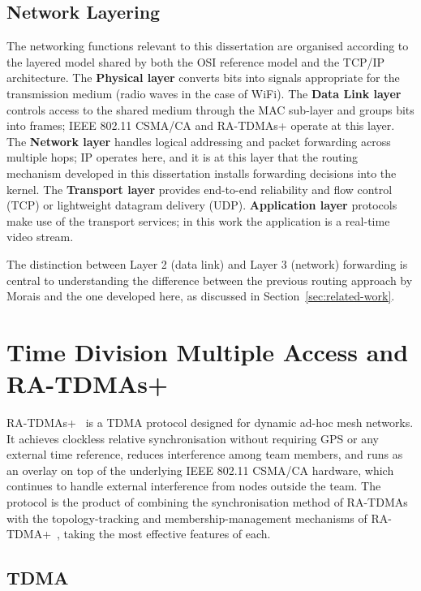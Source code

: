\subsection{Network Layering}

The networking functions relevant to this dissertation are organised according
to the layered model shared by both the OSI reference model and the TCP/IP
architecture. The \textbf{Physical layer} converts bits into signals
appropriate for the transmission medium (radio waves in the case of WiFi).
The \textbf{Data Link layer} controls access to the shared medium through the
MAC sub-layer and groups bits into frames; IEEE 802.11 CSMA/CA and RA-TDMAs+
operate at this layer. The \textbf{Network layer} handles logical addressing
and packet forwarding across multiple hops; IP operates here, and it is at
this layer that the routing mechanism developed in this dissertation installs
forwarding decisions into the kernel. The \textbf{Transport layer} provides
end-to-end reliability and flow control (TCP) or lightweight datagram delivery
(UDP). \textbf{Application layer} protocols make use of the transport
services; in this work the application is a real-time video stream.

The distinction between Layer 2 (data link) and Layer 3 (network) forwarding
is central to understanding the difference between the previous routing
approach by Morais and the one developed here, as discussed in
Section~\ref{sec:related-work}.


\section{Time Division Multiple Access and RA-TDMAs+}
\label{sec:ra-tdma}

RA-TDMAs+~\cite{oliveira2018clockless} is a TDMA protocol designed for
dynamic ad-hoc mesh networks. It achieves clockless relative
synchronisation without requiring GPS or any external time reference,
reduces interference among team members, and runs as an overlay on top of
the underlying IEEE 802.11 CSMA/CA hardware, which continues to handle
external interference from nodes outside the team. The protocol is the
product of combining the synchronisation method of RA-TDMAs~\cite{sousa2012ra}
with the topology-tracking and membership-management mechanisms of
RA-TDMA+~\cite{oliveira2018clockless}, taking the most effective features
of each.

\subsection{TDMA}

